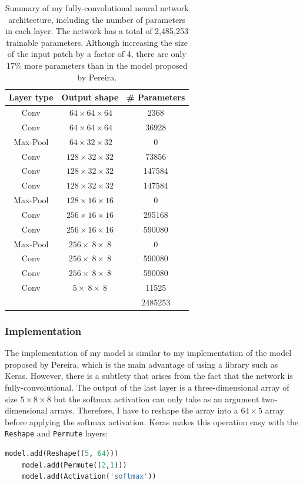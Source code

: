 \documentclass[12pt,a4paper,twoside,openright]{report}
\begin{document}
\begin{table}[h]
\centering	
\begin{tabular}{ c c S[table-format=7.0] } 
\textbf{Layer type} & \textbf{Output shape} & \textbf{\# Parameters} \\
 \hline
 Conv 		& $\ 64 	\times 64 	\times 64$ 	& 2368 \\ 
 Conv 		& $\ 64 	\times 64 	\times 64$ 	& 36928 \\ 
Max-Pool 	& $\ 64 	\times 32 	\times 32$ 	& 0\\
 Conv 		& $128 		\times 32 	\times 32$	& 73856 \\ 
 Conv 		& $128 		\times 32 	\times 32$ 	& 147584 \\ 
 Conv 		& $128 		\times 32 	\times 32$ 	& 147584 \\ 
Max-Pool 	& $128 		\times 16 	\times 16$	& 0\\
 Conv 		& $256 		\times 16 	\times 16$ 	& 295168 \\ 
 Conv 		& $256 		\times 16 	\times 16$ 	& 590080 \\ 
Max-Pool 	& $256 		\times\ 8 	\times\ 8$	& 0\\
 Conv 		& $256 		\times\ 8 	\times\ 8$	& 590080 \\ 
 Conv 		& $256 		\times\ 8 	\times\ 8$ 	& 590080 \\ 
 Conv 		& $5 		\times\ 8 	\times\ 8$ 	& 11525 \\ 
\hhline{~~=}
\rule{0pt}{3ex}    
&& 2485253\\
\end{tabular}
\caption[Summary of my fully-convolutional neural network architecture.]{Summary of my fully-convolutional neural network architecture, including the number of parameters in each layer. The network has a total of 2,485,253 trainable parameters. Although increasing the size of the input patch by a factor of 4, there are only 17\% more parameters than in the model proposed by Pereira.}
\label{table:my_model}
\end{table}

\subsubsection{Implementation}
The implementation of my model is similar to my implementation of the model proposed by Pereira, which is the main advantage of using a library such as Keras. However, there is a subtlety that arises from the fact that the network is fully-convolutional. The output of the last layer is a three-dimensional array of size $5 \times 8 \times 8$ but the softmax activation can only take as an argument two-dimensional arrays. Therefore, I have to reshape the array into a $64 \times 5$ array before applying the softmax activation. Keras makes this operation easy with the \texttt{Reshape} and \texttt{Permute} layers:
\begin{lstlisting}[language=Python]
	model.add(Reshape((5, 64)))
	model.add(Permute((2,1)))
	model.add(Activation('softmax'))
\end{lstlisting}
\end{document}
